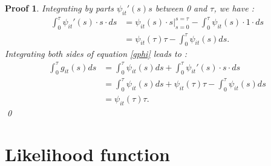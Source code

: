 \newtheorem*{proof2}{Proof}
\begin{proof2}
Integrating by parts $\psi_{it}'(s) s$ between 0 and $\tau$, we have :
\begin{align*}
    \int_0^{\tau}\psi_{it}'(s)\cdot s \cdot ds &= \psi_{it}(s) \cdot s|_{s=0}^{s=\tau} - \int_0^{\tau}\psi_{it}(s) \cdot 1 \cdot ds \\
    &= \psi_{it}(\tau) \tau - \int_0^{\tau}\psi_{it}(s) ds.
\end{align*}
Integrating both sides of equation \ref{gphi} leads to :
\begin{align*}
    \int_0^{\tau} g_{it}(s) ds &= \int_0^{\tau}\psi_{it}(s)ds + \int_0^{\tau}\psi_{it}'(s)\cdot s \cdot ds \\
    &= \int_0^{\tau}\psi_{it}(s)ds + \psi_{it}(\tau) \tau - \int_0^{\tau}\psi_{it}(s) ds \\
    &= \psi_{it}(\tau) \tau.
\end{align*} \qed
\end{proof2}

\section{Likelihood function}
\label{appendix1}


